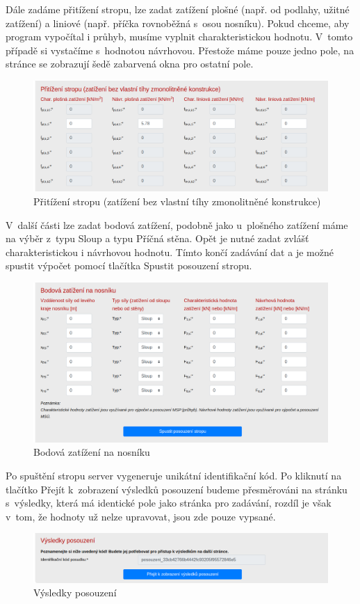 Dále zadáme přitížení stropu, lze zadat zatížení plošné (např. od podlahy, užitné zatížení) a liniové (např. příčka rovnoběžná s~osou nosníku). Pokud chceme, aby program vypočítal i průhyb, musíme vyplnit charakteristickou hodnotu. V~tomto případě si vystačíme s~hodnotou návrhovou. Přestože máme pouze jedno pole, na stránce se zobrazují šedě zabarvená okna pro ostatní pole.
\begin{figure}[H]
    \includegraphics{assets/figures/wbapp/strop/05_pritizeni.png}
    \caption{Přitížení stropu (zatížení bez vlastní tíhy zmonolitněné konstrukce)}
    \label{fig:wb_app_pritizeni}
\end{figure}

V~další části lze zadat bodová zatížení, podobně jako u~plošného zatížení máme na výběr z~typu Sloup a typu Příčná stěna. Opět je nutné zadat zvlášť charakteristickou i návrhovou hodnotu. Tímto končí zadávání dat a je možné spustit výpočet pomocí tlačítka Spustit posouzení stropu.
\begin{figure}[H]
    \includegraphics{assets/figures/wbapp/strop/06_bodova.png}
    \caption{Bodová zatížení na nosníku}
    \label{fig:wb_app_bodova}
\end{figure}

Po spuštění stropu server vygeneruje unikátní identifikační kód. Po kliknutí na tlačítko Přejít k~zobrazení výsledků posouzení budeme přesměrováni na stránku s~výsledky, která má identické pole jako stránka pro zadávání, rozdíl je však v~tom, že hodnoty už nelze upravovat, jsou zde pouze vypsané.
\begin{figure}[H]
    \includegraphics{assets/figures/wbapp/strop/07_posouzeni.png}
    \caption{Výsledky posouzení}
    \label{fig:wb_app_posouzeni}
\end{figure}

